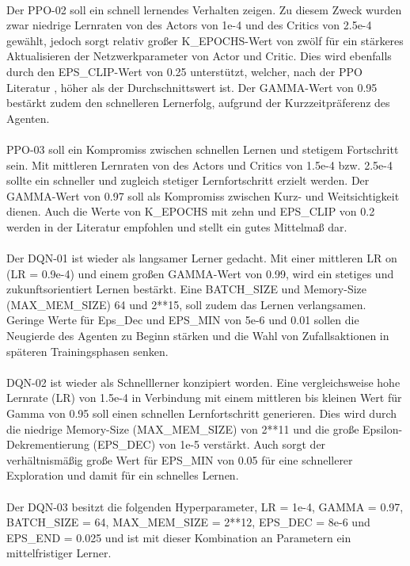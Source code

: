 \\ Der PPO-02 soll ein schnell lernendes Verhalten zeigen. Zu diesem Zweck wurden zwar niedrige Lernraten von des Actors von 1e-4 und des Critics von 2.5e-4 gewählt, jedoch sorgt relativ großer K\_EPOCHS-Wert von zwölf für ein stärkeres Aktualisieren der Netzwerkparameter von Actor und Critic. Dies wird ebenfalls durch den EPS\_CLIP-Wert von 0.25 unterstützt, welcher, nach der PPO Literatur \cite[S. 6]{PPO}, höher als der Durchschnittswert ist. Der GAMMA-Wert von 0.95 bestärkt zudem den schnelleren Lernerfolg, aufgrund der Kurzzeitpräferenz des Agenten.\\
\\PPO-03 soll ein Kompromiss zwischen schnellen Lernen und stetigem Fortschritt sein. Mit mittleren Lernraten von des Actors und Critics von 1.5e-4 bzw. 2.5e-4 sollte ein schneller und zugleich stetiger Lernfortschritt erzielt werden. Der GAMMA-Wert von 0.97 soll als Kompromiss zwischen Kurz- und Weitsichtigkeit dienen. Auch die Werte von K\_EPOCHS mit zehn und EPS\_CLIP von 0.2 werden in der Literatur \cite[Anhang A]{PPO} empfohlen und stellt ein gutes Mittelmaß dar.\\
\\Der DQN-01 ist wieder als langsamer Lerner gedacht. Mit einer mittleren LR on (LR = 0.9e-4) und einem großen GAMMA-Wert von 0.99, wird ein stetiges und zukunftsorientiert Lernen bestärkt. Eine BATCH\_SIZE und Memory-Size (MAX\_MEM\_SIZE) 64 und 2**15, soll zudem das Lernen verlangsamen. Geringe Werte für Eps\_Dec und EPS\_MIN von 5e-6 und 0.01 sollen die Neugierde des Agenten zu Beginn stärken und die Wahl von Zufallsaktionen in späteren Trainingsphasen senken.\\
\\DQN-02 ist wieder als Schnelllerner konzipiert worden. Eine vergleichsweise hohe Lernrate (LR) von 1.5e-4 in Verbindung mit einem mittleren bis kleinen Wert für Gamma von 0.95 soll einen schnellen Lernfortschritt generieren. Dies wird durch die niedrige Memory-Size (MAX\_MEM\_SIZE) von 2**11 und die große Epsilon-Dekrementierung (EPS\_DEC) von 1e-5 verstärkt. Auch sorgt der verhältnismäßig große Wert für EPS\_MIN von 0.05 für eine schnellerer Exploration und damit für ein schnelles Lernen.\\
\\ Der DQN-03 besitzt die folgenden Hyperparameter, LR = 1e-4, GAMMA = 0.97, BATCH\_SIZE = 64, MAX\_MEM\_SIZE = 2**12, 
EPS\_DEC = 8e-6 und EPS\_END = 0.025 und ist mit dieser Kombination an Parametern ein mittelfristiger Lerner.

